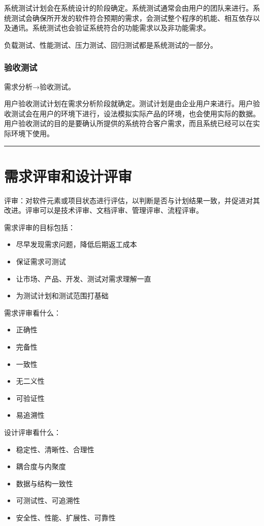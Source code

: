 \documentclass[11pt]{article}
\begin{document}
系统测试计划会在系统设计的阶段确定。系统测试通常会由用户的团队来进行。系统测试会确保所开发的软件符合预期的需求，会测试整个程序的机能、相互依存以及通讯。系统测试也会验证系统符合的功能需求以及非功能需求。

负载测试、性能测试、压力测试、回归测试都是系统测试的一部分。
\subsubsection{验收测试}
\label{sec:orge099fc4}
需求分析→验收测试。

用户验收测试计划在需求分析阶段就确定。测试计划是由企业用户来进行。用户验收测试会在用户的环境下进行，设法模拟实际产品的环境，也会使用实际的数据。用户验收测试的目的是要确认所提供的系统符合客户需求，而且系统已经可以在实际环境下使用。

\noindent\rule{\textwidth}{0.5pt}
\section{需求评审和设计评审}
\label{sec:orgaae529a}

评审：对软件元素或项目状态进行评估，以判断是否与计划结果一致，并促进对其改进。评审可以是技术评审、文档评审、管理评审、流程评审。

需求评审的目标包括：
\begin{itemize}
\item 尽早发现需求问题，降低后期返工成本
\item 保证需求可测试
\item 让市场、产品、开发、测试对需求理解一直
\item 为测试计划和测试范围打基础
\end{itemize}


需求评审看什么：
\begin{itemize}
\item 正确性
\item 完备性
\item 一致性
\item 无二义性
\item 可验证性
\item 易追溯性
\end{itemize}


设计评审看什么：
\begin{itemize}
\item 稳定性、清晰性、合理性
\item 耦合度与内聚度
\item 数据与结构一致性
\item 可测试性、可追溯性
\item 安全性、性能、扩展性、可靠性
\end{itemize}
\end{document}
